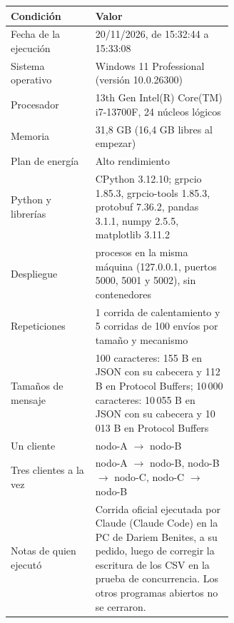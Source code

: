 \begin{tabular}{lp{0.62\linewidth}}
\toprule
Condición & Valor \\
\midrule
Fecha de la ejecución & 20/11/2026, de 15:32:44 a 15:33:08 \\
Sistema operativo & Windows 11 Professional (versión 10.0.26300) \\
Procesador & 13th Gen Intel(R) Core(TM) i7-13700F, 24 núcleos lógicos \\
Memoria & 31,8 GB (16,4 GB libres al empezar) \\
Plan de energía & Alto rendimiento \\
Python y librerías & CPython 3.12.10; grpcio 1.85.3, grpcio-tools 1.85.3, protobuf 7.36.2, pandas 3.1.1, numpy 2.5.5, matplotlib 3.11.2 \\
Despliegue & procesos en la misma máquina (127.0.0.1, puertos 5000, 5001 y 5002), sin contenedores \\
Repeticiones & 1 corrida de calentamiento y 5 corridas de 100 envíos por tamaño y mecanismo \\
Tamaños de mensaje & 100 caracteres: 155 B en JSON con su cabecera y 112 B en Protocol Buffers; 10\,000 caracteres: 10\,055 B en JSON con su cabecera y 10\,013 B en Protocol Buffers \\
Un cliente & nodo-A $\rightarrow$ nodo-B \\
Tres clientes a la vez & nodo-A $\rightarrow$ nodo-B, nodo-B $\rightarrow$ nodo-C, nodo-C $\rightarrow$ nodo-B \\
Notas de quien ejecutó & Corrida oficial ejecutada por Claude (Claude Code) en la PC de Dariem Benites, a su pedido, luego de corregir la escritura de los CSV en la prueba de concurrencia. Los otros programas abiertos no se cerraron. \\
\bottomrule
\end{tabular}
